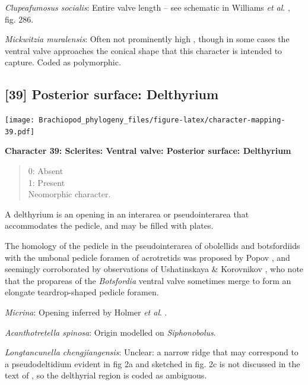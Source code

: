 \documentclass[]{book}
\theoremstyle{definition}
\theoremstyle{definition}
\theoremstyle{definition}
\theoremstyle{remark}
\begin{document}
\emph{Clupeafumosus socialis}: Entire valve length -- see schematic in
Williams \emph{et al}. \citeyearpar{Williams1997BrachiopodaRevised},
fig. 286.

\emph{Mickwitzia muralensis}: Often not prominently high
\citep{Skovsted2003EarlyCambrian, Balthasar2004Shellstructure}, though
in some cases \citep[e.g.][]{Butler2015Exceptionallypreserved} the
ventral valve approaches the conical shape that this character is
intended to capture. Coded as polymorphic.

\hypertarget{posterior-surface-delthyrium}{%
\subsection*{{[}39{]} Posterior surface:
Delthyrium}\label{posterior-surface-delthyrium}}

\texttt{[image: Brachiopod\_phylogeny\_files/figure-latex/character-mapping-39.pdf]}

\textbf{Character 39: Sclerites: Ventral valve: Posterior surface:
Delthyrium}

\begin{quote}
0: Absent\\
1: Present\\
Neomorphic character.
\end{quote}

A delthyrium is an opening in an interarea or pseudointerarea that
accommodates the pedicle, and may be filled with plates.

The homology of the pedicle in the pseudointerarea of obolellids and
botsfordiids with the umbonal pedicle foramen of acrotretids was
proposed by Popov \citeyearpar{Popov1992TheCambrian}, and seemingly
corroborated by observations of Ushatinskaya \& Korovnikov
\citeyearpar{Ushatinskaya2016Revisionof}, who note that the propareas of
the \emph{Botsfordia} ventral valve sometimes merge to form an elongate
teardrop-shaped pedicle foramen.

\emph{Micrina}: Opening inferred by Holmer \emph{et al}.
\citeyearpar{Holmer2008TheEarly}.

\emph{Acanthotretella spinosa}: Origin modelled on \emph{Siphonobolus}.

\emph{Longtancunella chengjiangensis}: Unclear: a narrow ridge that may
correspond to a pseudodeltidium evident in fig 2a and sketched in fig.
2c is not discussed in the text of \citet{Zhang2011Theexceptionally}, so
the delthyrial region is coded as ambiguous.
\end{document}
